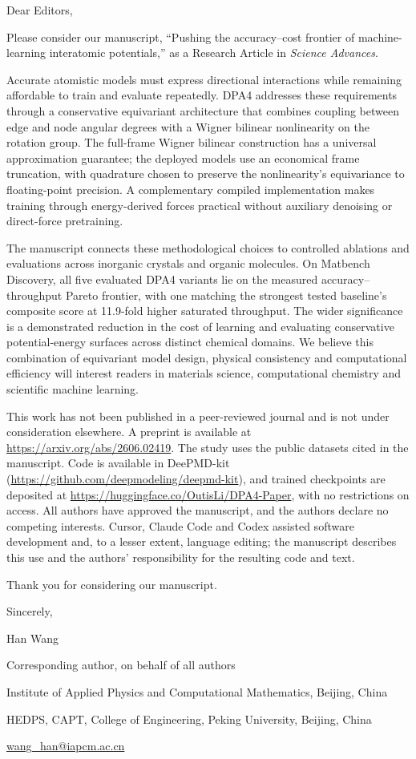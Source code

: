 \documentclass[11pt]{article}
\begin{document}
Dear Editors,

Please consider our manuscript, ``Pushing the accuracy--cost frontier of machine-learning interatomic potentials,'' as a Research Article in \textit{Science Advances}.

Accurate atomistic models must express directional interactions while remaining affordable to train and evaluate repeatedly.
DPA4 addresses these requirements through a conservative equivariant architecture that combines coupling between edge and node angular degrees with a Wigner bilinear nonlinearity on the rotation group.
The full-frame Wigner bilinear construction has a universal approximation guarantee; the deployed models use an economical frame truncation, with quadrature chosen to preserve the nonlinearity's equivariance to floating-point precision.
A complementary compiled implementation makes training through energy-derived forces practical without auxiliary denoising or direct-force pretraining.

The manuscript connects these methodological choices to controlled ablations and evaluations across inorganic crystals and organic molecules.
On Matbench Discovery, all five evaluated DPA4 variants lie on the measured accuracy--throughput Pareto frontier, with one matching the strongest tested baseline's composite score at 11.9-fold higher saturated throughput.
The wider significance is a demonstrated reduction in the cost of learning and evaluating conservative potential-energy surfaces across distinct chemical domains.
We believe this combination of equivariant model design, physical consistency and computational efficiency will interest readers in materials science, computational chemistry and scientific machine learning.

This work has not been published in a peer-reviewed journal and is not under consideration elsewhere.
A preprint is available at \url{https://arxiv.org/abs/2606.02419}.
The study uses the public datasets cited in the manuscript.
Code is available in DeePMD-kit (\url{https://github.com/deepmodeling/deepmd-kit}), and trained checkpoints are deposited at \url{https://huggingface.co/OutisLi/DPA4-Paper}, with no restrictions on access.
All authors have approved the manuscript, and the authors declare no competing interests.
Cursor, Claude Code and Codex assisted software development and, to a lesser extent, language editing; the manuscript describes this use and the authors' responsibility for the resulting code and text.

Thank you for considering our manuscript.

Sincerely,\par
Han Wang\par
Corresponding author, on behalf of all authors\par
Institute of Applied Physics and Computational Mathematics, Beijing, China\par
HEDPS, CAPT, College of Engineering, Peking University, Beijing, China\par
\href{mailto:wang_han@iapcm.ac.cn}{wang\_han@iapcm.ac.cn}
\end{document}
